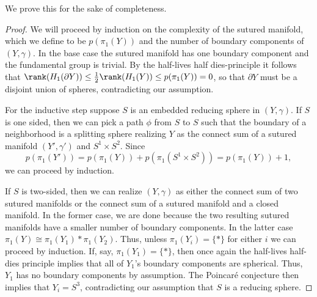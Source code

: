 \documentclass{amsart}
\theoremstyle{definition}
\theoremstyle{remark}
\numberwithin{equation}{section}
\begin{document}
We prove this for the sake of completeness.

\begin{proof}
  We will proceed by induction on the complexity of the sutured manifold, which we define to be $p(\pi_1(Y))$ and the number of boundary components of $(Y,\gamma)$. In the base case the sutured manifold has one boundary component and the fundamental group is trivial. By the half-lives half dies-principle it follows that $\rank(H_1(\partial Y))\leq\frac{1}{2}\rank(H_1(Y))\leq p(\pi_1(Y))=0$, so that $\partial Y$ must be a disjoint union of spheres, contradicting our assumption.

  For the inductive step suppose $S$ is an embedded reducing sphere in $(Y,\gamma)$. If $S$ is one sided, then we can pick a path $\phi$ from $S$ to $S$ such that the boundary of a neighborhood is a splitting sphere realizing $Y$ as the connect sum of a sutured manifold $(Y',\gamma')$ and $S^1\times  S^2$. Since $$p(\pi_1(Y'))=p(\pi_1(Y))+p(\pi_1(S^1\times S^2))=p(\pi_1(Y))+1,$$ we can proceed by induction.

  If $S$ is two-sided, then we can realize $(Y,\gamma)$ as either the connect sum of two sutured manifolds or the connect sum of a sutured manifold and a closed manifold. In the former case, we are done because the two resulting sutured manifolds have a smaller number of boundary components. In the latter case $\pi_1(Y)\cong\pi_1(Y_1)*\pi_1(Y_2)$. Thus, unless $\pi_1(Y_i)=\{*\}$ for either $i$ we  can proceed by induction. If, say, $\pi_1(Y_1)=\{*\}$, then once again the half-lives half-dies principle implies that all of $Y_1$'s boundary components are spherical. Thus, $Y_1$ has no boundary components by assumption. The Poincar\'e conjecture then implies that $Y_i=S^3$, contradicting our assumption that $S$ is a reducing sphere.
\end{proof}
\end{document}
